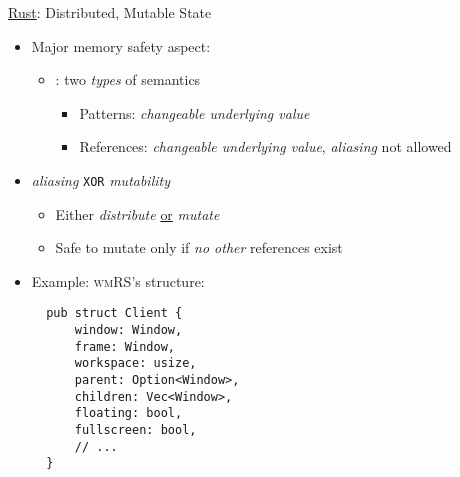 \begin{frame}[fragile]{\underline{Rust}: Distributed, Mutable State \hfill {\footnotesize \currentname}}

    \begin{itemize}

        \item Major memory safety aspect: 
            \begin{itemize}
                \item {}: two \textit{types} of semantics
                    \begin{itemize}
                        \item Patterns: \textit{changeable underlying value}
                        \item References: \textit{changeable underlying value}, \textit{aliasing} not allowed
                    \end{itemize}
            \end{itemize}

        \item \textit{aliasing} \texttt{XOR} \textit{mutability}
            \begin{itemize}
                \item Either \textit{distribute} \underline{or} \textit{mutate}
                \item Safe to mutate only if \textit{no other} references exist
            \end{itemize}

        \item Example: \textsc{wmRS}'s  structure:\\[3pt]
\begin{verbatim}
  pub struct Client {
      window: Window,
      frame: Window,
      workspace: usize,
      parent: Option<Window>,
      children: Vec<Window>,
      floating: bool,
      fullscreen: bool,
      // ...
  }
\end{verbatim}

    \end{itemize}

    \vfill

\end{frame}

